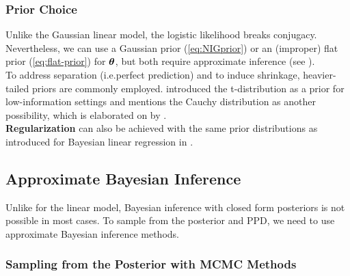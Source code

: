 \subsubsection*{Prior Choice}

Unlike the Gaussian linear model, the logistic likelihood breaks conjugacy.
Nevertheless, we can use a Gaussian prior (\autoref{eq:NIGprior}) or an (improper) flat prior (\autoref{eq:flat-prior}) for $\bm{\theta}$, but both require approximate inference (see ).\\

To address separation (i.e.\@ perfect prediction) and to induce shrinkage, heavier-tailed priors are commonly employed.
\citet{gelman_weakly_2008} introduced the t-distribution as a prior for low-information settings and mentions the Cauchy distribution as another possibility, which is elaborated on by \citet{ghosh_use_2017}.\\

\textbf{Regularization} can also be achieved with the same prior distributions as introduced for Bayesian linear regression in  \citep[see e.g.][]{van_erp_shrinkage_2019,fahrmeir_bayesian_2010,ohara_review_2009}.

\subsection{Approximate Bayesian Inference} \label{sec:logit-inf}

Unlike for the linear model, Bayesian inference with closed form posteriors is not possible in most cases.
To sample from the posterior and PPD, we need to use approximate Bayesian inference methods.

\subsubsection*{Sampling from the Posterior with MCMC Methods}

